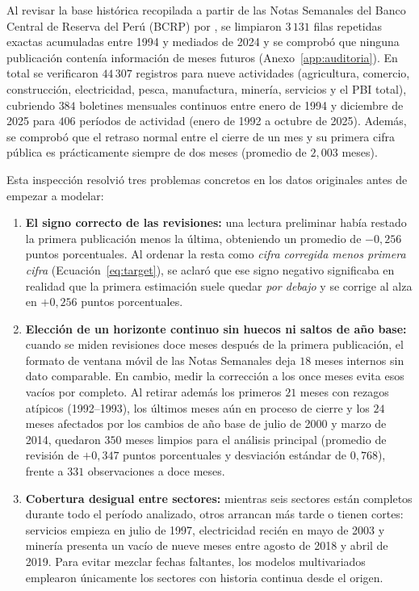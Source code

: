 Al revisar la base histórica recopilada a partir de las Notas Semanales del Banco Central de Reserva del Perú (BCRP) por \textcite{cruz2025}, se limpiaron \(3\,131\) filas repetidas exactas acumuladas entre 1994 y mediados de 2024 y se comprobó que ninguna publicación contenía información de meses futuros (Anexo~\ref{app:auditoria}). En total se verificaron \(44\,307\) registros para nueve actividades (agricultura, comercio, construcción, electricidad, pesca, manufactura, minería, servicios y el PBI total), cubriendo \(384\) boletines mensuales continuos entre enero de 1994 y diciembre de 2025 para \(406\) períodos de actividad (enero de 1992 a octubre de 2025). Además, se comprobó que el retraso normal entre el cierre de un mes y su primera cifra pública es prácticamente siempre de dos meses (promedio de \(2{,}003\) meses).

Esta inspección resolvió tres problemas concretos en los datos originales antes de empezar a modelar:
\begin{enumerate}
	\item \textbf{El signo correcto de las revisiones:} una lectura preliminar había restado la primera publicación menos la última, obteniendo un promedio de \(-0{,}256\) puntos porcentuales. Al ordenar la resta como \emph{cifra corregida menos primera cifra} (Ecuación~\ref{eq:target}), se aclaró que ese signo negativo significaba en realidad que la primera estimación suele quedar \emph{por debajo} y se corrige al alza en \(+0{,}256\) puntos porcentuales.
	\item \textbf{Elección de un horizonte continuo sin huecos ni saltos de año base:} cuando se miden revisiones doce meses después de la primera publicación, el formato de ventana móvil de las Notas Semanales deja \(18\) meses internos sin dato comparable. En cambio, medir la corrección a los once meses evita esos vacíos por completo. Al retirar además los primeros \(21\) meses con rezagos atípicos (1992--1993), los últimos meses aún en proceso de cierre y los \(24\) meses afectados por los cambios de año base de julio de 2000 y marzo de 2014, quedaron \(350\) meses limpios para el análisis principal (promedio de revisión de \(+0{,}347\) puntos porcentuales y desviación estándar de \(0{,}768\)), frente a \(331\) observaciones a doce meses.
	\item \textbf{Cobertura desigual entre sectores:} mientras seis sectores están completos durante todo el período analizado, otros arrancan más tarde o tienen cortes: servicios empieza en julio de 1997, electricidad recién en mayo de 2003 y minería presenta un vacío de nueve meses entre agosto de 2018 y abril de 2019. Para evitar mezclar fechas faltantes, los modelos multivariados emplearon únicamente los sectores con historia continua desde el origen.
\end{enumerate}
